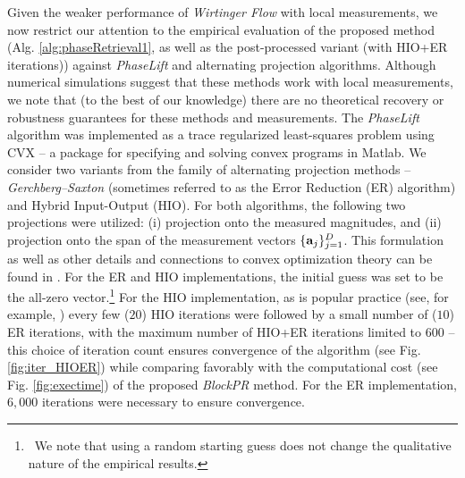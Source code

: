 Given the weaker performance of {\em Wirtinger Flow} with local measurements, we now restrict our attention to the empirical evaluation of the proposed method (Alg. \ref{alg:phaseRetrieval1}, as well as the post-processed variant (with HIO+ER iterations)) against {\em PhaseLift} and alternating projection algorithms. Although numerical simulations suggest that these methods work with local measurements, we note that (to the best of our knowledge) there are no theoretical recovery or robustness guarantees for these methods and measurements.  The {\em PhaseLift} algorithm was implemented as a trace regularized least-squares problem using CVX \cite{gb08,cvx} -- a package for specifying and solving convex programs in Matlab. We consider two variants from the family of alternating projection methods -- {\em Gerchberg--Saxton} (sometimes referred to as the Error Reduction (ER) algorithm) and Hybrid Input-Output (HIO). For both algorithms, the following two projections were utilized: (i) projection onto the measured magnitudes, and (ii) projection onto the span of the measurement vectors $\{\mathbf a_j\}_{j=1}^D$. This formulation as well as other details and connections to convex optimization theory can be found in \cite{bauschke2002phase}. For the ER and HIO implementations, the initial guess was set to be the all-zero vector.\footnote{\ We note that using a random starting guess does not change the qualitative nature of the empirical results.} For the HIO implementation, as is popular practice (see, for example, \cite{fienup1982comparison}) every few ($20$) HIO iterations were followed by a small number of ($10$) ER iterations, with the maximum number of HIO+ER iterations limited to $600$ -- this choice of iteration count ensures convergence of the algorithm (see Fig. \ref{fig:iter_HIOER}) while comparing favorably with the computational cost (see Fig. \ref{fig:exectime}) of the proposed {\em BlockPR} method. For the ER implementation, $6,000$ iterations were necessary to ensure convergence.

